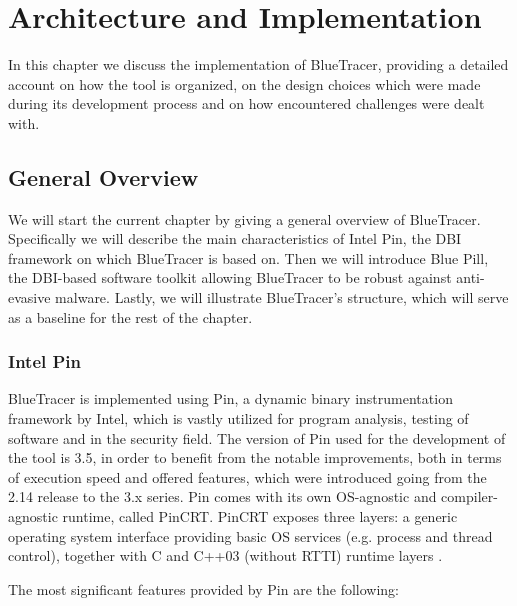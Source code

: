 
\chapter{Architecture and Implementation}
In this chapter we discuss the implementation of BlueTracer, providing a detailed account on how the tool is organized, on the design choices which were made during its development process and on how encountered challenges were dealt with.

\section{General Overview}

We will start the current chapter by giving a general overview of BlueTracer. Specifically we will describe the main characteristics of Intel Pin, the DBI framework on which BlueTracer is based on. Then we will introduce Blue Pill, the DBI-based software toolkit allowing BlueTracer to be robust against anti-evasive malware. Lastly, we will illustrate BlueTracer's structure, which will serve as a baseline for the rest of the chapter.  

\subsection{Intel Pin}
BlueTracer is implemented using Pin, a dynamic binary instrumentation framework by Intel, which is vastly utilized for program analysis, testing of software and in the security field. The version of Pin used for the development of the tool is 3.5, in order to benefit from the notable improvements, both in terms of execution speed and offered features, which were introduced going from the 2.14 release to the 3.x series. Pin comes with its own OS-agnostic and compiler-agnostic runtime, called PinCRT. PinCRT exposes three layers: a generic operating system interface providing basic OS services (e.g. process and thread control), together with C and C++03 (without RTTI) runtime layers \cite{Pin}.

The most significant features provided by Pin are the following:

